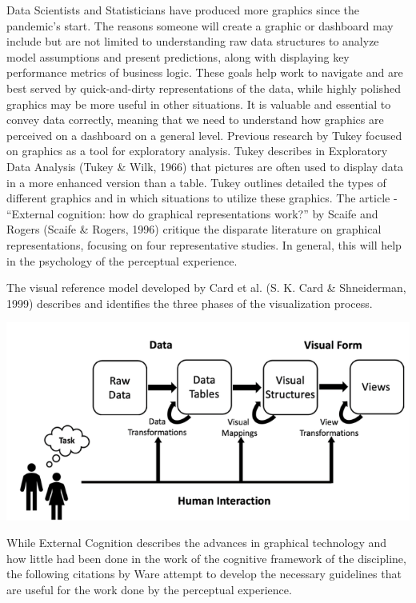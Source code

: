 \documentclass[print]{nuthesis}
\begin{document}
Data Scientists and Statisticians have produced more graphics since the pandemic's start. The reasons someone will create a graphic or dashboard may include but are not limited to understanding raw data structures to analyze model assumptions and present predictions, along with displaying key performance metrics of business logic. These goals help work to navigate and are best served by quick-and-dirty representations of the data, while highly polished graphics may be more useful in other situations. It is valuable and essential to convey data correctly, meaning that we need to understand how graphics are perceived on a dashboard on a general level. Previous research by Tukey focused on graphics as a tool for exploratory analysis. Tukey describes in Exploratory Data Analysis (Tukey \& Wilk, 1966) that pictures are often used to display data in a more enhanced version than a table. Tukey outlines detailed the types of different graphics and in which situations to utilize these graphics. The article - ``External cognition: how do graphical representations work?'' by Scaife and Rogers (Scaife \& Rogers, 1996) critique the disparate literature on graphical representations, focusing on four representative studies. In general, this will help in the psychology of the perceptual experience.

The visual reference model developed by Card et al. (S. K. Card \& Shneiderman, 1999) describes and identifies the three phases of the visualization process.

\begin{center}
\includegraphics[width=\textwidth]{figure/VizModelDiagram}
\end{center}

While External Cognition describes the advances in graphical technology and how little had been done in the work of the cognitive framework of the discipline, the following citations by Ware attempt to develop the necessary guidelines that are useful for the work done by the perceptual experience.
\end{document}
